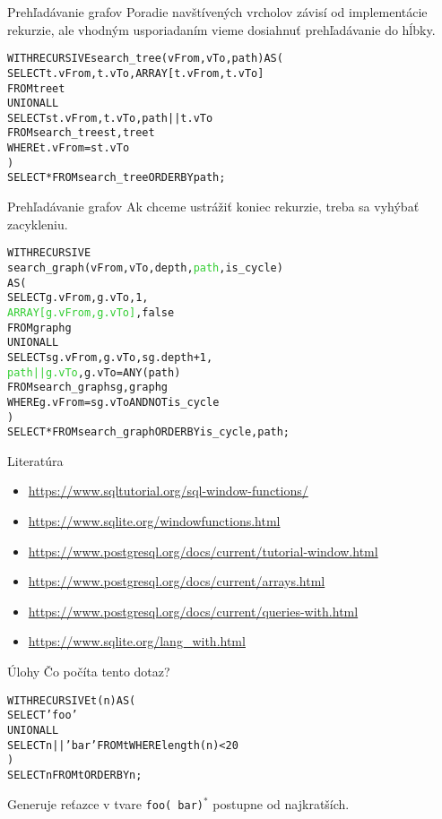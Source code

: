 \documentclass[12pt]{beamer}
\def\blue#1{\textcolor{Cerulean}{#1}}
\def\green#1{\textcolor{LimeGreen}{#1}}
\begin{document}
\begin{frame}[fragile]{Prehľadávanie grafov}
Poradie navštívených vrcholov závisí od implementácie rekurzie,
ale vhodným usporiadaním vieme dosiahnuť \alert{prehľadávanie do hĺbky}.
\bigskip
\begin{alltt}
WITH RECURSIVE search_tree(vFrom, vTo, \alert{path}) AS (
    SELECT t.vFrom, t.vTo, \alert{ARRAY[t.vFrom, t.vTo]}
    FROM tree t
  UNION ALL
    SELECT st.vFrom, t.vTo, \alert{path || t.vTo}
    FROM search_tree st, tree t
    WHERE t.vFrom = st.vTo
)
SELECT * FROM search_tree \alert{ORDER BY path};
\end{alltt}
\end{frame}

\begin{frame}[fragile]{Prehľadávanie grafov}
Ak chceme ustrážiť koniec rekurzie, treba sa vyhýbať \alert{zacykleniu}.
\bigskip
{\small
\begin{alltt}
WITH RECURSIVE
    search_graph(vFrom, vTo, depth, \green{path}, \blue{is_cycle})
AS (
    SELECT g.vFrom, g.vTo, 1,
        \green{ARRAY[g.vFrom, g.vTo]}, \blue{false}
    FROM graph g
  UNION ALL
    SELECT sg.vFrom, g.vTo, sg.depth + 1,
        \green{path || g.vTo}, \blue{g.vTo = ANY(path)}
    FROM search_graph sg, graph g
    WHERE g.vFrom = sg.vTo AND \blue{NOT is_cycle}
)
SELECT * FROM search_graph ORDER BY is_cycle, path;
\end{alltt}
}
\end{frame}


\begin{frame}{Literatúra}
\begin{itemize}
\item {\scriptsize\url{https://www.sqltutorial.org/sql-window-functions/}}
\item {\scriptsize\url{https://www.sqlite.org/windowfunctions.html}}
\item {\scriptsize\url{https://www.postgresql.org/docs/current/tutorial-window.html}}
\item {\scriptsize\url{https://www.postgresql.org/docs/current/arrays.html}}
\item {\scriptsize\url{https://www.postgresql.org/docs/current/queries-with.html}}
\item {\scriptsize\url{https://www.sqlite.org/lang_with.html}}
\end{itemize}
\end{frame}

\begin{frame}[fragile]{Úlohy}
Čo počíta tento dotaz?
\bigskip
{\small
\begin{alltt}
WITH RECURSIVE t(n) AS (
    SELECT 'foo'
  UNION ALL
    SELECT n || ' bar' FROM t WHERE length(n) < 20
)
SELECT n FROM t ORDER BY n;
\end{alltt}
}
\bigskip
\pause
Generuje reťazce v tvare \verb|foo( bar)|$^*$ postupne od najkratších.
\end{frame}
\end{document}
